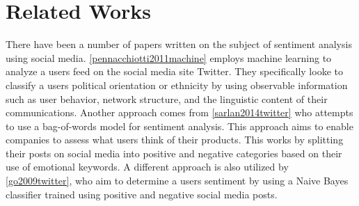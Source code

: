 \newpage\section{Related Works}
There have been a number of papers written on the subject of sentiment analysis
using social media. \autoref{pennacchiotti2011machine} employs machine learning
to analyze a users feed on the social media site Twitter. They specifically
looke to classify a users political orientation or ethnicity by using observable
information such as user behavior, network structure, and the linguistic content
of their communications. Another approach comes from \autoref{sarlan2014twitter}
who attempts to use a bag-of-words model for sentiment analysis. This approach
aims to enable companies to assess what users think of their products. This
works by splitting their posts on social media into positive and negative
categories based on their use of emotional keywords. A different approach is
also utilized by \autoref{go2009twitter}, who aim to determine a users sentiment
by using a Naive Bayes classifier trained using positive and negative social
media posts. 